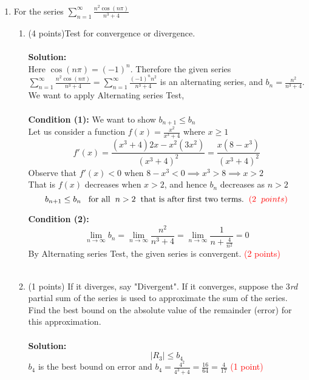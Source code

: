 \documentclass[paper=a4, fontsize=11pt]{scrartcl} %
\newcommand{\ds}{\displaystyle}
\numberwithin{equation}{section} %
\numberwithin{figure}{section} %
\numberwithin{table}{section} %
\begin{document}
\begin{enumerate}
\item For the series $\ds\sum_{n=1}^{\infty}\frac{n^2\cos(n\pi)}{n^3+4}$
\begin{enumerate} 
\item (4 points)\hspace{4mm}Test for convergence or divergence.\\\\
\textbf{Solution:}\\ Here\hspace{2mm} $\ds\cos(n\pi)=(-1)^n$. Therefore the given series $\ds\sum_{n=1}^{\infty}\frac{n^2\cos(n\pi)}{n^3+4}=\ds\sum_{n=1}^{\infty}\frac{(-1)^nn^2}{n^3+4}$ is an alternating series, and $b_n=\ds\frac{n^2}{n^3+4}$. We want to apply Alternating series Test,\\\\
\textbf{Condition (1):} We want to show $\ds b_{n+1}\le b_n$\\
Let us consider a function $f(x)=\ds\frac{x^2}{x^3+4}$ where $x\ge 1$
$$f'(x)=\ds\frac{(x^3+4)2x-x^2(3x^2)}{(x^3+4)^2}=\ds\frac{x(8-x^3)}{(x^3+4)^2}$$
Observe that $f'(x)<0$  when $8-x^3<0\implies x^3>8\implies x>2$\\
That is $f(x)$ decreases when $x>2$, and hence $b_n$ decreases as $n>2$
$$b_{n+1}\le b_n\hspace{3mm}\text{for all}\hspace{2mm}n>2\hspace{2mm}\text{that is after first two terms.}\hspace{2mm}\textcolor{red}{(2\hspace{2mm} points)}$$

\textbf{Condition (2):}  $$\lim\limits_{n\rightarrow\infty}b_n=\ds\lim\limits_{n\rightarrow\infty}\ds\frac{n^2}{n^3+4}=\ds\lim\limits_{n\rightarrow\infty}\ds\frac{1}{n+\frac{4}{n^2}}=0$$
By Alternating series Test, the given series is convergent. \textcolor{red}{(2\hspace{2mm} points)}\\\\
\item (1 points)\hspace{4mm} If it diverges, say "Divergent". If it converges, suppose the 3\textit{rd} partial sum of the series is used to approximate the sum of the series. Find the best bound on the absolute value of the remainder (error) for this approximation.\\\\
\textbf{Solution:}$$|R_3|\le b_4$$
$b_4$ is the best bound on error and $b_4=\frac{4^2}{4^3+4}=\frac{16}{64}=\frac{4}{17}$  \textcolor{red}{(1\hspace{1mm} point)}
\end{enumerate}


\end{enumerate}
\end{document}

